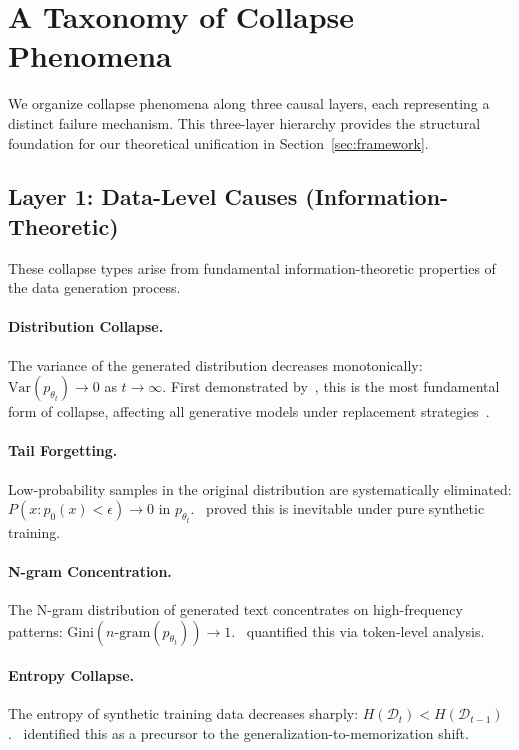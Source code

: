 \documentclass[11pt]{article}
\newcommand{\cD}{\mathcal{D}}
\begin{document}
\section{A Taxonomy of Collapse Phenomena}
\label{sec:taxonomy}

We organize collapse phenomena along three causal layers, each representing a distinct failure mechanism. This three-layer hierarchy provides the structural foundation for our theoretical unification in Section~\ref{sec:framework}.

\subsection{Layer 1: Data-Level Causes (Information-Theoretic)}
\label{sec:layer1}

These collapse types arise from fundamental information-theoretic properties of the data generation process.

\paragraph{Distribution Collapse.} The variance of the generated distribution decreases monotonically: $\mathrm{Var}(p_{\theta_t}) \to 0$ as $t \to \infty$. First demonstrated by~\citet{shumailov2023curse}, this is the most fundamental form of collapse, affecting all generative models under replacement strategies~\citep{rate2024collapse}.

\paragraph{Tail Forgetting.} Low-probability samples in the original distribution are systematically eliminated: $P(x : p_0(x) < \epsilon) \to 0$ in $p_{\theta_t}$.~\citet{dohmatob2024statistical} proved this is inevitable under pure synthetic training.

\paragraph{N-gram Concentration.} The N-gram distribution of generated text concentrates on high-frequency patterns: $\mathrm{Gini}(n\text{-}\mathrm{gram}(p_{\theta_t})) \to 1$.~\citet{zhu2024toedit} quantified this via token-level analysis.

\paragraph{Entropy Collapse.} The entropy of synthetic training data decreases sharply: $H(\cD_t) < H(\cD_{t-1})$.~\citet{martinez2025closer} identified this as a precursor to the generalization-to-memorization shift.
\end{document}
